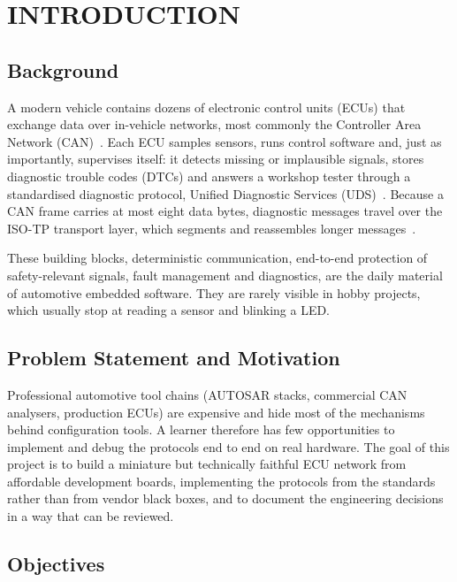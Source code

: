 \chapter{INTRODUCTION}
\label{ch:intro}

\section{Background}

A modern vehicle contains dozens of electronic control units (ECUs) that exchange data over in-vehicle networks, most commonly the Controller Area Network (CAN)~\cite{ISO11898-1}. Each ECU samples sensors, runs control software and, just as importantly, supervises itself: it detects missing or implausible signals, stores diagnostic trouble codes (DTCs) and answers a workshop tester through a standardised diagnostic protocol, Unified Diagnostic Services (UDS)~\cite{ISO14229-1}. Because a CAN frame carries at most eight data bytes, diagnostic messages travel over the ISO-TP transport layer, which segments and reassembles longer messages~\cite{ISO15765-2}.

These building blocks, deterministic communication, end-to-end protection of safety-relevant signals, fault management and diagnostics, are the daily material of automotive embedded software. They are rarely visible in hobby projects, which usually stop at reading a sensor and blinking a LED.

\section{Problem Statement and Motivation}

Professional automotive tool chains (AUTOSAR stacks, commercial CAN analysers, production ECUs) are expensive and hide most of the mechanisms behind configuration tools. A learner therefore has few opportunities to implement and debug the protocols end to end on real hardware. The goal of this project is to build a miniature but technically faithful ECU network from affordable development boards, implementing the protocols from the standards rather than from vendor black boxes, and to document the engineering decisions in a way that can be reviewed.

\section{Objectives}

